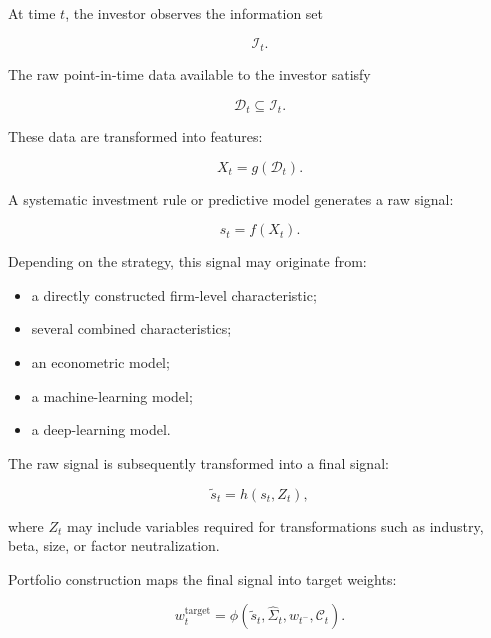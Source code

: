 \documentclass[11pt,a4paper]{article}
\begin{document}
At time $t$, the investor observes the information set

\begin{equation}
\mathcal{I}_t.
\end{equation}

The raw point-in-time data available to the investor satisfy

\begin{equation}
\mathcal{D}_t
\subseteq
\mathcal{I}_t.
\end{equation}

These data are transformed into features:

\begin{equation}
X_t
=
g(\mathcal{D}_t).
\end{equation}

A systematic investment rule or predictive model generates a raw signal:

\begin{equation}
s_t
=
f(X_t).
\end{equation}

Depending on the strategy, this signal may originate from:

\begin{itemize}
    \item a directly constructed firm-level characteristic;

    \item several combined characteristics;

    \item an econometric model;

    \item a machine-learning model;

    \item a deep-learning model.
\end{itemize}

The raw signal is subsequently transformed into a final signal:

\begin{equation}
\widetilde{s}_t
=
h
\left(
s_t,
Z_t
\right),
\end{equation}

where $Z_t$ may include variables required for transformations such as
industry, beta, size, or factor neutralization.

Portfolio construction maps the final signal into target weights:

\begin{equation}
w_t^{\mathrm{target}}
=
\phi
\left(
\widetilde{s}_t,
\widehat{\Sigma}_t,
w_{t^-},
\mathcal{C}_t
\right).
\end{equation}
\end{document}
